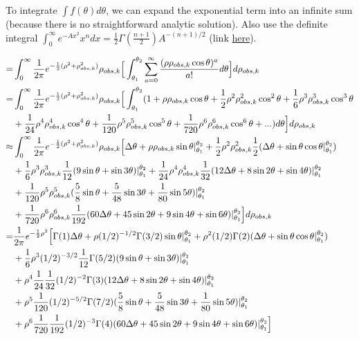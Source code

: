 \documentclass[12pt]{article}
\begin{document}
To integrate $\int f(\theta) d\theta$, we can expand the exponential term into an infinite sum (because there is no straightforward analytic solution). Also use the definite integral $\int_0^{\infty} e^{-Ax^2}x^ndx = \frac{1}{2}\Gamma(\frac{n+1}{2})A^{-(n+1)/2}$ (link \href{https://en.wikipedia.org/wiki/List_of_integrals_of_exponential_functions}{here}).

	\begin{align}
	=& \int_{0}^{\infty} \frac{1}{2\pi} e^{-\frac{1}{2}(\rho^2 + \rho^2_{obs,k})}\rho_{obs,k} \Big[\int_{\theta_1}^{\theta_2} \sum_{a=0}^{\infty} \frac{(\rho\rho_{obs,k}\cos\theta)^a}{a!} d\theta \Big]d\rho_{obs,k} \\
	=& \int_{0}^{\infty} \frac{1}{2\pi} e^{-\frac{1}{2}(\rho^2 + \rho^2_{obs,k})}\rho_{obs,k} \Big[\int_{\theta_1}^{\theta_2} 
		(1+\rho\rho_{obs,k}\cos\theta + \frac{1}{2}\rho^2\rho^2_{obs,k}\cos^2\theta + \frac{1}{6}\rho^3\rho^3_{obs,k}\cos^3\theta \\ \notag &+ \frac{1}{24}\rho^4\rho^4_{obs,k}\cos^4\theta + \frac{1}{120}\rho^5\rho^5_{obs,k}\cos^5\theta + \frac{1}{720}\rho^6\rho^6_{obs,k}\cos^6\theta + ...) d\theta \Big] d\rho_{obs,k} \\
	\approx& \int_{0}^{\infty} \frac{1}{2\pi} e^{-\frac{1}{2}(\rho^2 + \rho^2_{obs,k})}\rho_{obs,k} 
		\Big[
		\Delta\theta + \rho\rho_{obs,k}\sin\theta|_{\theta_1}^{\theta_2} + \frac{1}{2}\rho^2\rho^2_{obs,k}\frac{1}{2}(\Delta\theta + \sin\theta\cos\theta|_{\theta_1}^{\theta_2}) \\ \notag &+ \frac{1}{6}\rho^3\rho^3_{obs,k}\frac{1}{12}(9\sin\theta+\sin3\theta)|_{\theta_1}^{\theta_2} + \frac{1}{24}\rho^4\rho^4_{obs,k}\frac{1}{32}(12\Delta\theta+8\sin2\theta+\sin4\theta)|_{\theta_1}^{\theta_2} \\ \notag &+ \frac{1}{120}\rho^5\rho^5_{obs,k}(\frac{5}{8}\sin\theta + \frac{5}{48}\sin3\theta + \frac{1}{80}\sin5\theta)|_{\theta_1}^{\theta_2} \\ \notag &+ \frac{1}{720}\rho^6\rho^6_{obs,k}\frac{1}{192}(60\Delta\theta + 45\sin2\theta + 9\sin4\theta + \sin6\theta)|_{\theta_1}^{\theta_2}
		\Big] d\rho_{obs,k} \\
	=& \frac{1}{2\pi}e^{-\frac{1}{2}\rho^2}
		\Big[
		\Gamma(1)\Delta\theta + \rho(1/2)^{-1/2}\Gamma(3/2)\sin\theta|_{\theta_1}^{\theta_2} + \rho^2(1/2)\Gamma(2)(\Delta\theta + \sin\theta\cos\theta|_{\theta_1}^{\theta_2}) \\ \notag &+ \frac{1}{6}\rho^3(1/2)^{-3/2}\frac{1}{12}\Gamma(5/2)(9\sin\theta+\sin3\theta)|_{\theta_1}^{\theta_2} \\ \notag &+ \rho^4\frac{1}{24}\frac{1}{32}(1/2)^{-2}\Gamma(3)(12\Delta\theta+8\sin2\theta+\sin4\theta)|_{\theta_1}^{\theta_2} \\ \notag &+ \rho^5\frac{1}{120}(1/2)^{-5/2}\Gamma(7/2)(\frac{5}{8}\sin\theta + \frac{5}{48}\sin3\theta + \frac{1}{80}\sin5\theta)|_{\theta_1}^{\theta_2} \\ \notag &+ \rho^6\frac{1}{720}\frac{1}{192}(1/2)^{-3}\Gamma(4)(60\Delta\theta + 45\sin2\theta + 9\sin4\theta + \sin6\theta)|_{\theta_1}^{\theta_2}
		\Big] \\
	\end{align}
	
\end{document}
